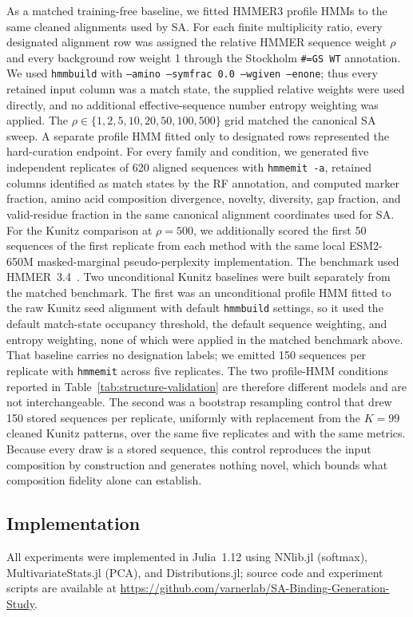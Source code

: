 As a matched training-free baseline, we fitted HMMER3 profile HMMs to the same cleaned
alignments used by SA. For each finite multiplicity ratio, every designated alignment row was
assigned the relative HMMER sequence weight $\rho$ and every background row weight 1 through
the Stockholm \texttt{\#=GS WT} annotation. We used \texttt{hmmbuild} with
\texttt{--amino --symfrac 0.0 --wgiven --enone}; thus every retained input column was a match
state, the supplied relative weights were used directly, and no additional effective-sequence
number entropy weighting was applied. The $\rho\in\{1,2,5,10,20,50,100,500\}$ grid matched
the canonical SA sweep. A separate profile HMM fitted only to designated rows represented the
hard-curation endpoint. For every family and condition, we generated five independent
replicates of 620 aligned sequences with \texttt{hmmemit -a}, retained columns identified as
match states by the RF annotation, and computed marker fraction, amino acid composition
divergence, novelty, diversity, gap fraction, and valid-residue fraction in the same canonical
alignment coordinates used for SA. For the Kunitz comparison at $\rho=500$, we additionally
scored the first 50 sequences of the first replicate from each method with the same local
ESM2-650M masked-marginal pseudo-perplexity implementation. The benchmark used
HMMER~3.4~\cite{hmmer3}.
Two unconditional Kunitz baselines were built separately from the matched benchmark. The first
was an unconditional profile HMM fitted to the raw Kunitz seed alignment with default
\texttt{hmmbuild} settings, so it used the default match-state occupancy threshold, the default
sequence weighting, and entropy weighting, none of which were applied in the matched benchmark
above. That baseline carries no designation labels; we emitted 150 sequences per replicate with
\texttt{hmmemit} across five replicates. The two profile-HMM conditions reported in
Table~\ref{tab:structure-validation} are therefore different models and are not interchangeable.
The second was a bootstrap resampling control that drew 150 stored sequences per replicate,
uniformly with replacement from the $K=99$ cleaned Kunitz patterns, over the same five
replicates and with the same metrics. Because every draw is a stored sequence, this control
reproduces the input composition by construction and generates nothing novel, which bounds what
composition fidelity alone can establish.

\subsection{Implementation}

All experiments were implemented in Julia~1.12 using NNlib.jl
(softmax), MultivariateStats.jl (PCA), and Distributions.jl; source code and experiment scripts
are available at \url{https://github.com/varnerlab/SA-Binding-Generation-Study}.

